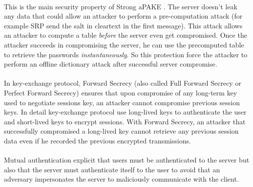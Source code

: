 \documentclass[../report.tex]{subfiles}
\begin{document}
\paragraph{}
This is the main security property of Strong aPAKE \cite{OPAQUE_Paper}. The server doesn't leak any data that could allow an attacker to perform a pre-computation attack (for example SRP send the salt in cleartext in the first message). This attack allows an attacker to compute a table \emph{before} the server even get compromised. Once the attacker succeeds in compromising the server, he can use the precomputed table to retrieve the passwords \emph{instantaneously}. So this protection force the attacker to perform an offline dictionary attack after successful server compromise. %


\paragraph{}
In key-exchange protocol, Forward Secrecy (also called Full Forward Secrecy or Perfect Forward Secrecy) ensures that upon compromise of any long-term key used to negotiate sessions key, an attacker cannot compromise previous session keys.
In detail key-exchange protocol use long-lived keys to authenticate the user and short-lived keys to encrypt sessions. With Forward Secrecy, an attacker that successfully compromised a long-lived key cannot retrieve any previous session data even if he recorded the previous encrypted transmissions. %

\paragraph{}
Mutual authentication explicit that users must be authenticated to the server but also that the server must authenticate itself to the user to avoid that an adversary impersonates the server to maliciously communicate with the client.
\end{document}
